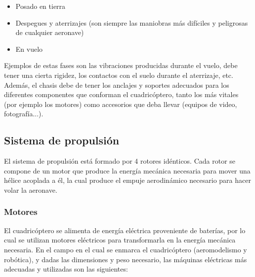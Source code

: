 \documentclass[12pt,twoside]{article}
\begin{document}
		\begin{itemize}

			\item Posado en tierra
			\item Despegues y aterrizajes (son siempre las maniobras más difíciles y peligrosas de cualquier aeronave)
			\item En vuelo
		\end{itemize}
		Ejemplos de estas fases son las vibraciones producidas durante el vuelo, debe tener una cierta rigidez, los contactos con el suelo durante el aterrizaje, etc.
Además, el chasis debe de tener los anclajes y soportes adecuados para los diferentes componentes que conforman el cuadricóptero, tanto los más vitales (por ejemplo los motores) como accesorios que deba llevar (equipos de video, fotografía...).


			
			
		\subsection{Sistema de propulsión}\label{subsec:propulsion}
		
		El sistema de propulsión está formado por 4 rotores idénticos. Cada rotor se compone de un motor que produce la energía mecánica necesaria para mover una hélice acoplada a él, la cual produce el empuje aerodinámico necesario para hacer volar la aeronave.
			\subsubsection{Motores}\label{subsubsec:motores}
			El cuadricóptero se alimenta de energía eléctrica proveniente de baterías, por lo cual se utilizan motores eléctricos para transformarla en la energía mecánica necesaria.
En el campo en el cual se enmarca el cuadricóptero (aeromodelismo y robótica), y dadas las dimensiones y peso necesario, las máquinas eléctricas más adecuadas y utilizadas son las siguientes:
\end{document}
